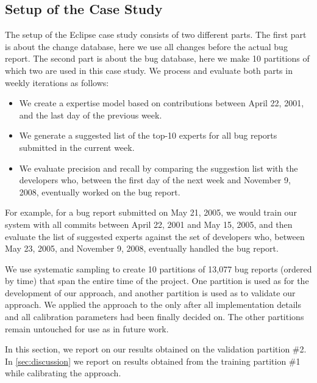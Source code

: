 \documentclass[10pt]{book}
\begin{document}
\subsection{Setup of the Case Study}

The setup of the Eclipse case study consists of two different parts. The first part is about the change database, here we use all changes before the actual bug report. The second part is about the bug database, here we make 10 partitions of which two are used in this case study. We process and evaluate  both parts in weekly iterations as follows:
\begin{itemize}
\item We create a \DEVLECT expertise model based on contributions between April 22, 2001, and the last day of the previous week.
\item We generate a suggested list of the top-10 experts for all bug reports submitted in the current week.
\item We evaluate precision and recall by comparing the suggestion list with the developers who, between the first day of the next week and November 9, 2008, eventually worked on the bug report.
\end{itemize}

For example, for a bug report submitted on May 21, 2005, we would train our system with all commits between April 22, 2001 and May 15, 2005, and then evaluate the list of suggested experts against the set of developers who, between May 23, 2005, and November 9, 2008, eventually handled the bug report.

We use systematic sampling to create 10 partitions of 13,077 bug reports (ordered by time) that span the entire time of the project. One partition is used as \trainingset for the development of our approach, and another partition is used as \validationset to validate our approach. We applied the approach to the \validationset only after all implementation details and all calibration parameters had been finally decided on. The other partitions remain untouched for use as \validationset in future work.

In this section, we report on our results obtained on the validation partition \#2. In \autoref{sec:discussion} we report on results obtained from the training partition \#1 while calibrating the approach.

\end{document}
